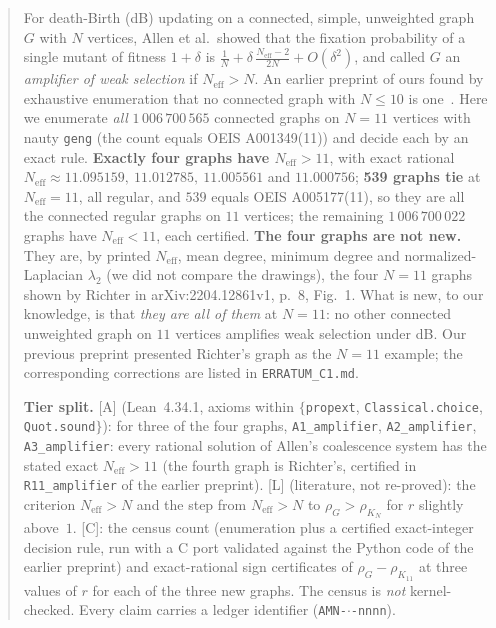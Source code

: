 \documentclass[10pt]{article}
\newcommand{\tier}[1]{\textsf{[#1]}}
\newcommand{\tA}{\tier{A}}
\newcommand{\tL}{\tier{L}}
\newcommand{\tC}{\tier{C}}
\newcommand{\lean}[1]{\texttt{#1}}
\newcommand{\Neff}{N_{\mathrm{eff}}}
\begin{document}
\begin{abstract}
For death-Birth (dB) updating on a connected, simple, unweighted graph $G$ with $N$ vertices, Allen et al.\ showed that the fixation probability
of a single mutant of fitness $1+\delta$ is $\tfrac1N+\delta\,\tfrac{\Neff-2}{2N}+O(\delta^2)$, and called $G$ an \emph{amplifier of weak selection} if $\Neff>N$.
An earlier preprint of ours found by exhaustive enumeration that no connected graph with $N\le10$ is one~\cite{c1}. Here we enumerate \emph{all}
$1\,006\,700\,565$ connected graphs on $N=11$ vertices with nauty \texttt{geng} (the count equals OEIS A001349(11)) and decide each by an exact rule.
\textbf{Exactly four graphs have $\Neff>11$}, with exact rational $\Neff\approx11.095159,\ 11.012785,\ 11.005561$ and $11.000756$; \textbf{539 graphs tie} at $\Neff=11$, all regular, and $539$ equals OEIS A005177(11), so they are all the connected regular graphs on $11$ vertices;
the remaining $1\,006\,700\,022$ graphs have $\Neff<11$, each certified.
\textbf{The four graphs are not new.} They are, by printed $\Neff$, mean degree, minimum degree and normalized-Laplacian $\lambda_2$ (we did not compare the drawings), the four $N=11$ graphs shown by
Richter in arXiv:2204.12861v1, p.~8, Fig.~1. What is new, to our knowledge, is that \emph{they are all of them} at $N=11$: no other connected unweighted graph on $11$ vertices amplifies weak selection under dB.
Our previous preprint presented Richter's graph as the $N=11$ example; the corresponding corrections are listed in \texttt{ERRATUM\_C1.md}.

\textbf{Tier split.}
\tA{} (Lean~4.34.1, axioms within $\{$\lean{propext}, \lean{Classical.choice}, \lean{Quot.sound}$\}$): for three of the four graphs, \lean{A1\_amplifier}, \lean{A2\_amplifier}, \lean{A3\_amplifier}: every rational solution of Allen's coalescence system has the stated exact $\Neff>11$ (the fourth graph is Richter's, certified in \lean{R11\_amplifier} of the earlier preprint).
\tL{} (literature, not re-proved): the criterion $\Neff>N$ and the step from $\Neff>N$ to $\rho_G>\rho_{K_N}$ for $r$ slightly above~$1$.
\tC{}: the census count (enumeration plus a certified exact-integer decision rule, run with a C port validated against the Python code of the earlier preprint) and exact-rational sign certificates of $\rho_G-\rho_{K_{11}}$ at three values of $r$ for each of the three new graphs. The census is \emph{not} kernel-checked.
Every claim carries a ledger identifier (\texttt{AMN-$\cdot$-nnnn}).

\medskip
\noindent{}
\end{abstract}
\end{document}
